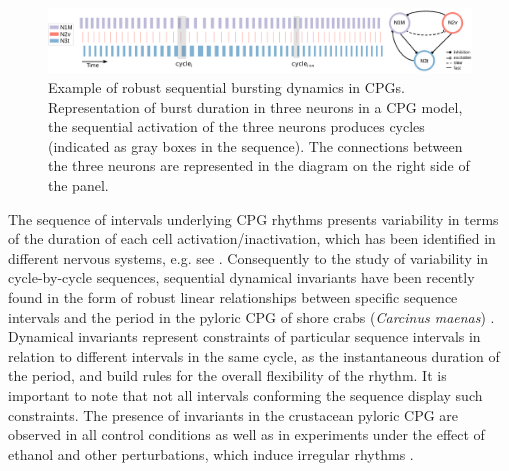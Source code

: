 \begin{figure}[htb!]
	\includegraphics[width=\textwidth]{img/invariants/variability/sequences_in_cpgs.png}
	\caption{Example of robust sequential bursting dynamics in CPGs. Representation of burst duration in three neurons in a CPG model, the sequential activation of the three neurons produces cycles (indicated as gray boxes in the sequence). The connections between the three neurons are represented in the diagram on the right side of the panel.}
	\label{fig:sequences_in_cpgs}
\end{figure}

The sequence of intervals underlying CPG rhythms presents variability in terms of the duration of each cell activation/inactivation, which has been identified in different nervous systems, e.g. see \cite{reyes_artificial_2008,elliott_temporal_1991,martinez_shortterm_2019}. Consequently to the study of variability in cycle-by-cycle sequences, sequential dynamical invariants have been recently found in the form of robust linear relationships between specific sequence intervals and the period in the pyloric CPG of shore crabs (\textit{Carcinus maenas}) \parencite{elices_robust_2019}. Dynamical invariants represent constraints of particular sequence intervals in relation to different intervals in the same cycle, as the instantaneous duration of the period, and build rules for the overall flexibility of the rhythm. It is important to note that not all intervals conforming the sequence display such constraints. The presence of invariants in the crustacean pyloric CPG are observed in all control conditions as well as in experiments under the effect of ethanol and other perturbations, which induce irregular rhythms \parencite{elices_robust_2019}. 



